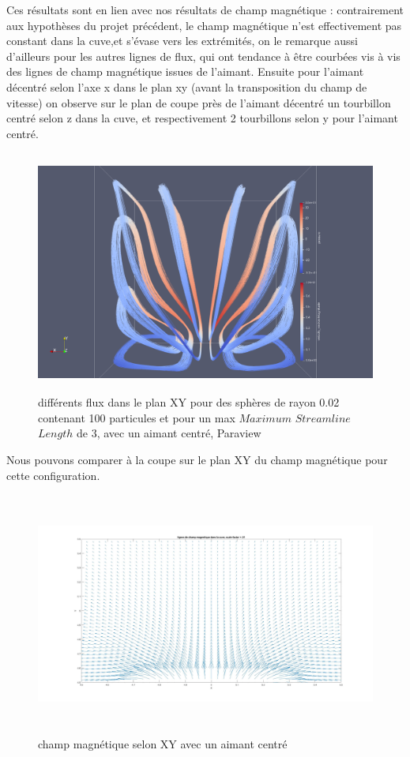 \documentclass[a4paper,12pt,titlepage]{report}
\begin{document}
\begin{onehalfspace}
Ces résultats sont en lien avec nos résultats de champ magnétique : contrairement aux hypothèses du projet 
précédent, le champ magnétique n'est effectivement pas constant dans la cuve,et s'évase vers les extrémités, on 
le remarque aussi d'ailleurs pour les autres lignes de flux, qui ont tendance à être courbées vis à vis des 
lignes 
de champ magnétique issues de l'aimant. Ensuite pour l'aimant décentré selon l'axe x dans le plan xy (avant la transposition du champ de 
vitesse) on observe sur le plan de coupe près de l'aimant décentré un tourbillon centré selon z dans la cuve, et 
respectivement 2 tourbillons selon y pour l'aimant centré.
 \begin{figure}[!h]
\begin{center}
\includegraphics[height = 8cm, keepaspectratio]{graphes/Paraview/differents_flux_centre_100pt_lenght4_rad05.png} 
\caption{différents flux dans le plan XY pour des sphères de rayon 0.02 contenant 100 particules et pour un max $Maximum$ $Streamline$ $Length$  de 3, avec un aimant centré, Paraview}
\label{figure 33}
\end{center}
\end{figure}

Nous pouvons comparer à la coupe sur le plan XY du champ magnétique pour cette configuration.

\begin{figure}[!h]
\begin{center} 
\includegraphics[height = 8cm, keepaspectratio]{graphes/coupe_2D_champ_centre.jpg} 
\caption{ champ magnétique selon XY avec un aimant centré}
\label{figure 34}
\end{center}
\end{figure}


\end{onehalfspace}
\end{document}
